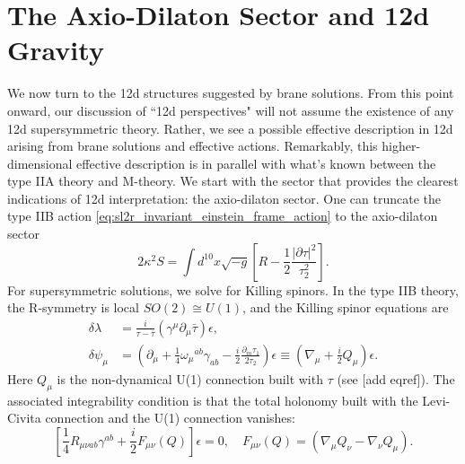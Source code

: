 \section{The Axio-Dilaton Sector and 12d Gravity}
We now turn to the 12d structures suggested by brane solutions.
From this point onward, our discussion of ``12d perspectives" will not assume the existence of any 12d supersymmetric theory.
Rather, we see a possible effective description in 12d arising from brane solutions and effective actions.
Remarkably, this higher-dimensional effective description is in parallel with what's known between the type IIA theory and M-theory.
We start with the sector that provides the clearest indications of 12d interpretation: the axio-dilaton sector.
One can truncate the type IIB action \eqref{eq:sl2r_invariant_einstein_frame_action} to the axio-dilaton sector
\begin{equation}
2\kappa^2S=
\int d^{10}x\sqrt{-g}\left[
R-\frac{1}{2}\frac{|\partial \tau|^2}{\tau_2^2}
\right].
\label{IIB axio-dilaton action}
\end{equation}
For supersymmetric solutions, we solve for Killing spinors.
In the type IIB theory, the R-symmetry is local $SO(2)\cong U(1)$, and the Killing spinor equations are \cite{Bergshoeff:2006jj}
\begin{equation}
\begin{aligned}
\delta\lambda
&=\frac{i}{\tau-\bar\tau}(\gamma^\mu\partial_\mu \bar\tau)\epsilon,\\
\delta\psi_\mu
&=
\left(
\partial_\mu+\frac{1}{4}\omega_\mu{}^{ab}\gamma_{ab} -\frac{i}{2}\frac{\partial_m \tau_1}{2\tau_2}
\right)\epsilon
\equiv\left(\nabla_\mu+\frac{i}{2}Q_\mu\right)\epsilon.
\end{aligned}
\label{9+1 IIB axio-dilaton Killing spinor equations}
\end{equation}
Here $Q_\mu$ is the non-dynamical U(1) connection built with $\tau$ (see [add eqref]). 
The associated integrability condition is that the total holonomy built with the Levi-Civita connection and the U(1) connection vanishes:
\begin{equation}
\left[\frac{1}{4}R_{\mu\nu ab}\gamma^{ab}
+ \frac{i}{2}F_{\mu\nu}(Q)\right]
\epsilon = 0,\quad
F_{\mu\nu}(Q)=(\nabla_\mu Q_\nu-\nabla_\nu Q_\mu).
\label{eq:axio-dilaton-integrability}
\end{equation}
